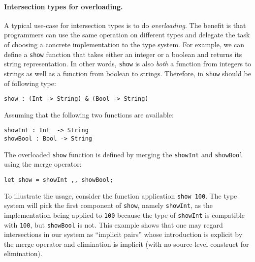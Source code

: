 
\paragraph{Intersection types for overloading.}
A typical use-case for intersection types is to do
\emph{overloading}. The benefit is that programmers can use the same
operation on different types and delegate the task of choosing a
concrete implementation to the type system. For example, we can define
a \lstinline{show} function that takes either an integer or a boolean
and returns its string representation. In other words, \lstinline{show} is also
\emph{both} a function from integers to strings as well as a function
from boolean to strings.  Therefore, in \name \lstinline{show} should be of
following type:
\begin{lstlisting}
show : (Int -> String) & (Bool -> String)
\end{lstlisting}
Assuming that the following two functions are available:
\begin{lstlisting}
showInt : Int  -> String
showBool : Bool -> String
\end{lstlisting}

\noindent The overloaded \lstinline{show} function is defined by
merging the \lstinline{showInt} and \lstinline{showBool} using the
merge operator:

\begin{lstlisting}
let show = showInt ,, showBool;
\end{lstlisting}

To illustrate the usage, consider the function application \lstinline{show 100}.
The type system will pick the first component of \lstinline{show}, namely
\lstinline{showInt}, as the implementation being applied to \lstinline{100}
because the type of \lstinline{showInt} is compatible with \lstinline{100}, but
\lstinline{showBool} is not. This example shows that one may regard
intersections in our system as ``implicit pairs'' whose introduction is explicit
by the merge operator and elimination is implicit (with no source-level
construct for elimination).



